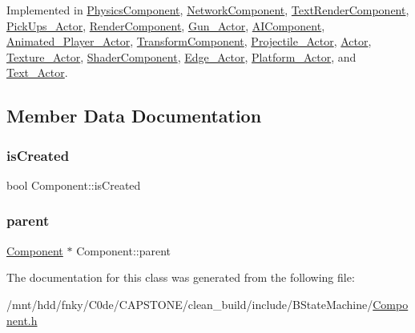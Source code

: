 Implemented in \hyperlink{classPhysicsComponent_a7494b2fec675132ee3e31050d7d87d30}{Physics\+Component}, \hyperlink{classNetworkComponent_ae731efcb319689aa9848ad8631ddfffc}{Network\+Component}, \hyperlink{classTextRenderComponent_a73c53ed27b94597551536fda5775fb49}{Text\+Render\+Component}, \hyperlink{classPickUps__Actor_a3f098ecced007eaa97719faaf7ba35d4}{Pick\+Ups\+\_\+\+Actor}, \hyperlink{classRenderComponent_a93203c887b05a024f70f30e8a71576bd}{Render\+Component}, \hyperlink{classGun__Actor_ab5e7b6b7032e1f0353c6c4f08cedebec}{Gun\+\_\+\+Actor}, \hyperlink{classAIComponent_a456939f85de6d6cfc3e4e48ffc9f568c}{A\+I\+Component}, \hyperlink{classAnimated__Player__Actor_aa383063c812e8b0015f18485ab000d65}{Animated\+\_\+\+Player\+\_\+\+Actor}, \hyperlink{classTransformComponent_a0cd568e49687464927c79ac7ab03f004}{Transform\+Component}, \hyperlink{classProjectile__Actor_ab61aec7117a93626c3096bef71ab30fc}{Projectile\+\_\+\+Actor}, \hyperlink{classActor_a724ff8f2e9c34f15a6c443a3912504c4}{Actor}, \hyperlink{classTexture__Actor_afe03163ea0bff0ea0fa3c3fb6c560c79}{Texture\+\_\+\+Actor}, \hyperlink{classShaderComponent_ab8f4b5e17bf77b20e509ac94c9dddc10}{Shader\+Component}, \hyperlink{classEdge__Actor_a8ae8a19c72b58522755d2d0a395fc1ea}{Edge\+\_\+\+Actor}, \hyperlink{classPlatform__Actor_a12b22d88efc384ac35060d04fbbe710d}{Platform\+\_\+\+Actor}, and \hyperlink{classText__Actor_a26181e1102ab2a37ec8b140c999a6f6a}{Text\+\_\+\+Actor}.



\subsection{Member Data Documentation}
\mbox{\label{classComponent_addf22788d84ea7450e70e8793dc2fe8d}} 
\subsubsection{\texorpdfstring{is\+Created}{isCreated}}
{\footnotesize\ttfamily bool Component\+::is\+Created\hspace{0.3cm}{\ttfamily [protected]}}

\mbox{\label{classComponent_a8d7b023bf6615e457842e02e28d7ab07}} 
\subsubsection{\texorpdfstring{parent}{parent}}
{\footnotesize\ttfamily \hyperlink{classComponent}{Component} $\ast$ Component\+::parent\hspace{0.3cm}{\ttfamily [protected]}}



The documentation for this class was generated from the following file\+:\begin{DoxyCompactItemize}
\item 
/mnt/hdd/fnky/\+C0de/\+C\+A\+P\+S\+T\+O\+N\+E/clean\+\_\+build/include/\+B\+State\+Machine/\hyperlink{BStateMachine_2Component_8h}{Component.\+h}\end{DoxyCompactItemize}
